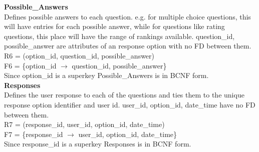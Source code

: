\documentclass[12pt, oneside, a4paper]{article}
\newcommand{\tb}[1]{\textbf{#1}}
\begin{document}
    \tb{Possible\_Answers} \\
    Defines possible answers to each question. e.g. for multiple choice questions, this will have entries for each possible answer, while for questions like rating questions, this place will have the range of rankings available. question\_id, possible\_answer are attributes of an response option with no FD between them. \\
    R6 = (option\_id, question\_id, possible\_answer) \\
    F6 = \{option\_id \(\rightarrow\) question\_id, possible\_answer\} \\
    Since option\_id is a superkey Possible\_Answers is in BCNF form. 
    \\

    \tb{Responses} \\
    Defines the user response to each of the questions and ties them to the unique response option identifier and user id. user\_id, option\_id, date\_time have no FD between them. \\
    R7 = (response\_id, user\_id, option\_id, date\_time) \\
    F7 = \{response\_id $\rightarrow$ user\_id, option\_id, date\_time\} \\
    Since response\_id is a superkey Responses is in BCNF form. 
    \\
\end{document}
